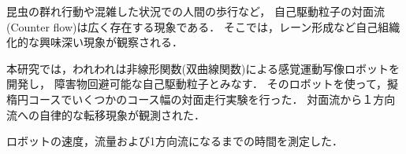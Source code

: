 昆虫の群れ行動や混雑した状況での人間の歩行など，
自己駆動粒子の対面流(Counter flow)は広く存在する現象である．
そこでは，レーン形成など自己組織化的な興味深い現象が観察される．

本研究では，われわれは非線形関数(双曲線関数)による感覚運動写像ロボットを開発し，
障害物回避可能な自己駆動粒子とみなす．
そのロボットを使って，擬楕円コースでいくつかのコース幅の対面走行実験を行った．
対面流から１方向流への自律的な転移現象が観測された．

ロボットの速度，流量および1方向流になるまでの時間を測定した．
